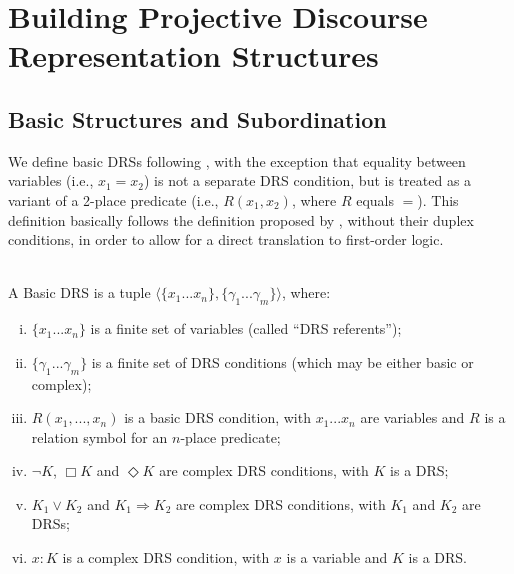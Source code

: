 \section{Building Projective Discourse Representation Structures}


\subsection{Basic Structures and Subordination}

We define basic DRSs following , with the
exception that equality between variables (i.e., $x_1=x_2$) is not
a separate DRS condition, but is treated as a variant of a 2-place predicate
(i.e., $R(x_1,x_2)$, where $R$ equals $=$). This definition basically
follows the definition proposed by , without
their duplex conditions, in order to allow for a direct translation to
first-order logic.

\begin{definition} \label{def:bDRS}~\\
A Basic DRS is a tuple $\langle \{x_1 ... x_n\},\{\gamma_1 ... \gamma_m\} 
\rangle$, where:
 \begin{enumerate}[i.]
  \item $\{x_1 ... x_n\}$ is a finite set of variables (called ``DRS
    referents'');
  \item $\{\gamma_1 ... \gamma_m\}$ is a finite set of DRS conditions (which
    may be either basic or complex);
  \item\label{def:bDRS:Rel} $R(x_1, ..., x_n)$ is a basic DRS condition,
    with $x_1 ... x_n$ are variables and $R$ is a relation symbol for an
    $n$-place predicate;
  \item $\neg K$, $\Box K$ and $\Diamond K$ are complex DRS conditions, with
    $K$ is a DRS;
  \item $K_1 \vee K_2$ and $K_1 \Rightarrow K_2$ are complex DRS conditions,
    with $K_1$ and $K_2$ are DRSs;
  \item \label{def:bDRS:Prop} $x:K$ is a complex DRS condition, with $x$ is
    a variable and $K$ is a DRS.
 \end{enumerate} 
\end{definition}


